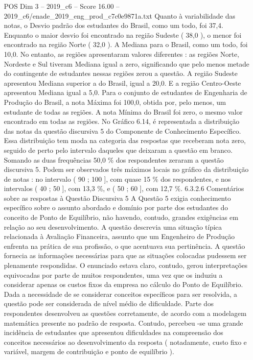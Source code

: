 \begin{textsample}{POS Dim 3 – 2019\_c6 – Score 16.00 – 2019\_c6/enade\_2019\_eng\_prod\_c7c0e9871a.txt}
Quanto à variabilidade das notas, o Desvio padrão dos estudantes do Brasil, como um todo, foi 37,4.
Enquanto o maior desvio foi encontrado na região Sudeste ( 38,0 ), o menor foi encontrado na região Norte ( 32,0 ).
A Mediana para o Brasil, como um todo, foi 10,0.
No entanto, as regiões apresentaram valores diferentes : as regiões Norte, Nordeste e Sul tiveram Mediana igual a zero, significando que pelo menos metade do contingente de estudantes nessas regiões zerou a questão.
A região Sudeste apresentou Mediana superior a do Brasil, igual a 20,0.
E a região Centro-Oeste apresentou Mediana igual a 5,0.
Para o conjunto de estudantes de Engenharia de Produção do Brasil, a nota Máxima foi 100,0, obtida por, pelo menos, um estudante de todas as regiões.
A nota Mínima do Brasil foi zero, o mesmo valor encontrado em todas as regiões.
No Gráfico 6.14, é representada a distribuição das notas da questão discursiva 5 do Componente de Conhecimento Específico.
Essa distribuição tem moda na categoria das respostas que receberam nota zero, seguido de perto pelo intervalo daqueles que deixaram a questão em branco.
Somando as duas frequências 50,0 \% dos respondentes zeraram a questão discursiva 5.
Podem ser observados três máximos locais no gráfico da distribuição de notas : no intervalo ( 90 ; 100 ], com quase 15 \% dos respondentes, e nos intervalos ( 40 ; 50 ], com 13,3 \%, e ( 50 ; 60 ], com 12,7 \%. 6.3.2.6 Comentários sobre as respostas à Questão Discursiva 5 A Questão 5 exigia conhecimento específico sobre o assunto abordado e domínio por parte dos estudantes do conceito de Ponto de Equilíbrio, não havendo, contudo, grandes exigências em relação ao seu desenvolvimento.
A questão descrevia uma situação típica relacionada à Avaliação Financeira, assunto que um Engenheiro de Produção enfrenta na prática de sua profissão, o que acentuava sua pertinência.
A questão fornecia as informações necessárias para que as situações colocadas pudessem ser plenamente respondidas.
O enunciado estava claro, contudo, gerou interpretações equivocadas por parte de muitos respondentes, uma vez que os induziu a considerar apenas os custos fixos da empresa no cálculo do Ponto de Equilíbrio.
Dada a necessidade de se considerar conceitos específicos para ser resolvida, a questão pode ser considerada de nível médio de dificuldade.
Parte dos respondentes desenvolveu as questões corretamente, de acordo com a modelagem matemática presente no padrão de resposta.
Contudo, percebeu -se uma grande incidência de estudantes que apresentou dificuldades na compreensão dos conceitos necessários ao desenvolvimento da resposta ( notadamente, custo fixo e variável, margem de contribuição e ponto de equilíbrio ).

\end{textsample}
